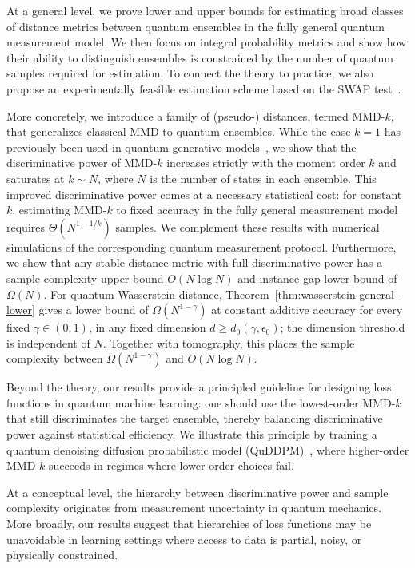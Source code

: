 \documentclass[aps,prx,reprint,superscriptaddress,amsmath,amssymb,longbibliography,floatfix]{revtex4-2}
\theoremstyle{plain}
\theoremstyle{definition}
\theoremstyle{remark}
\begin{document}
At a general level, we prove lower and upper bounds for estimating broad classes of distance metrics between quantum ensembles in the fully general quantum measurement model. We then focus on integral probability metrics and show how their ability to distinguish ensembles is constrained by the number of quantum samples required for estimation. To connect the theory to practice, we also propose an experimentally feasible estimation scheme based on the SWAP test~\cite{barenco1997stabilization,buhrman2001quantum}.

More concretely, we introduce a family of (pseudo-) distances, termed MMD-\(k\), that generalizes classical MMD to quantum ensembles. While the case \(k=1\) has previously been used in quantum generative models~\cite{QuDDPM_PhysRevLett.132.100602}, we show that the discriminative power of MMD-\(k\) increases strictly with the moment order \(k\) and saturates at \(k\sim N\), where \(N\) is the number of states in each ensemble. This improved discriminative power comes at a necessary statistical cost: for constant \(k\), estimating MMD-\(k\) to fixed accuracy in the fully general measurement model requires \(\Theta(N^{1-1/k})\) samples. We complement these results with numerical simulations of the corresponding quantum measurement protocol. Furthermore, we show that any stable distance metric with full discriminative power has a sample complexity upper bound \(O(N\log N)\) and instance-gap lower bound of \(\Omega(N)\). For quantum Wasserstein distance, Theorem~\ref{thm:wasserstein-general-lower} gives a lower bound of \(\Omega(N^{1-\gamma})\) at constant additive accuracy for every fixed $\gamma\in(0,1)$, in any fixed dimension $d\ge d_0(\gamma,\epsilon_0)$; the dimension threshold is independent of $N$. Together with tomography, this places the sample complexity between \(\Omega(N^{1-\gamma})\) and \(O(N\log N)\).

Beyond the theory, our results provide a principled guideline for designing loss functions in quantum machine learning: one should use the lowest-order MMD-\(k\) that still discriminates the target ensemble, thereby balancing discriminative power against statistical efficiency. We illustrate this principle by training a quantum denoising diffusion probabilistic model (QuDDPM)~\cite{QuDDPM_PhysRevLett.132.100602}, where higher-order MMD-\(k\) succeeds in regimes where lower-order choices fail.

At a conceptual level, the hierarchy between discriminative power and sample complexity originates from measurement uncertainty in quantum mechanics. More broadly, our results suggest that hierarchies of loss functions may be unavoidable in learning settings where access to data is partial, noisy, or physically constrained.
\end{document}
